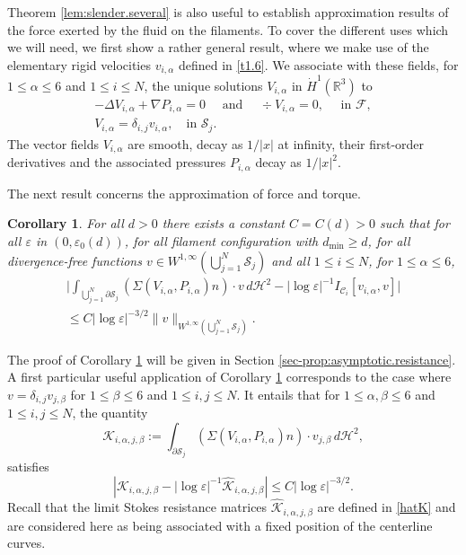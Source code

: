 \documentclass[10pt]{amsart}
\newcommand{\R}{\mathbb{R}}
\let\eps\varepsilon
\newcommand{\dmin}{d_{\min}}
\newtheorem{cor}[thm]{Corollary}
\theoremstyle{definition}
\theoremstyle{remark}
\let\oldbigcup\bigcup
\begin{document}
Theorem \ref{lem:slender.several} is also useful to establish
approximation results of the force {exerted by the fluid on the filaments.}
To cover the different uses which we will need, we first show a rather general result, where we make use of the elementary rigid velocities $v_{i,\alpha}$ defined in \eqref{t1.6}. We associate with these fields, for $1 \leq \alpha\leq 6$ and $1 \leq i \leq N$, the unique solutions $ V_{i,\alpha}$ in $\dot H^1(\R^3)$ to
\begin{subequations}
\label{sti}
\begin{gather}
\label{sti1}
-\Delta V_{i,\alpha} + \nabla P_{i,\alpha} = 0 \quad \text{ and } \quad \div V_{i,\alpha} = 0, \quad \text{ in } \mathcal F,
\\ \label{sti3}
V_{i,\alpha} = \delta_{i,j} v_{i,\alpha}, \quad \text{in } \mathcal S_j.
\end{gather}
\end{subequations}
The vector fields $ V_{i,\alpha} $ are smooth, decay as $1/ \vert x \vert$ at infinity, their first-order derivatives and the associated pressures $P_{i,\alpha}$ decay as $1/ \vert x \vert^2$.

The next result concerns the approximation of force and torque.
\begin{cor} \label{prop:asymptotic.resistance}
For all $d > 0$ there exists a constant $C = C(d) > 0$ such that for all $\eps $ in $(0, \eps_0(d))$, for all filament configuration with $\dmin \geq d$, for all divergence-free functions $v \in W^{1,\infty}(\bigcup_{j=1}^N \mathcal S_j)$ and all $1 \leq i \leq N$, for $1 \leqslant \alpha \leqslant 6 $,
\begin{multline}
\biggl| \int_{\oldbigcup_{j=1}^N \partial \mathcal S_j} (\Sigma (V_{i,\alpha}, P_{i,\alpha}) n) \cdot v \, d\mathcal{H}^2 - \left|\log \eps\right|^{-1}
I_{\mathcal{C}_i } [v_{i,\alpha}, v]
\biggr| \\
\leq C \left|\log \eps\right|^{- 3/2} \|v\|_{W^{1,\infty}{(\oldbigcup_{j=1}^N \mathcal S_j)}}.
\label{eq:Faxen.force}
\end{multline}
\end{cor}
The proof of Corollary \ref{prop:asymptotic.resistance} will be given in Section \ref{sec-prop:asymptotic.resistance}.
A first particular useful application of Corollary \ref{prop:asymptotic.resistance} corresponds to the case where $v=\delta_{i,j}v_{j,\beta}$ for $1 \leq \beta \leq 6$ and $1 \leq i,j \leq N$. It entails that for $1 \leq \alpha,\beta \leq 6$ and $1 \leq i,j \leq N$, the quantity
\begin{equation} \label{resis}
\mathcal K_{i,\alpha,j,\beta} := \int_{\partial \mathcal S_j} (\Sigma (V_{i,\alpha}, P_{i,\alpha}) n) \cdot v_{j,\beta} \, d\mathcal{H}^2,
\end{equation}
satisfies
\begin{equation}
\left| \mathcal K_{i,\alpha,j,\beta} -
\left|\log \eps\right|^{-1} \hat{\mathcal K}_{i,\alpha,j,\beta}
\right| \leq C \left|\log \eps\right|^{-3/2}. \label{eq:approx.K}
\end{equation}
Recall that the limit Stokes resistance matrices $ \hat{\mathcal K}_{i,\alpha,j,\beta}$ are defined in \eqref{hatK} and are considered here as being associated with a fixed position of the centerline curves.
\end{document}
